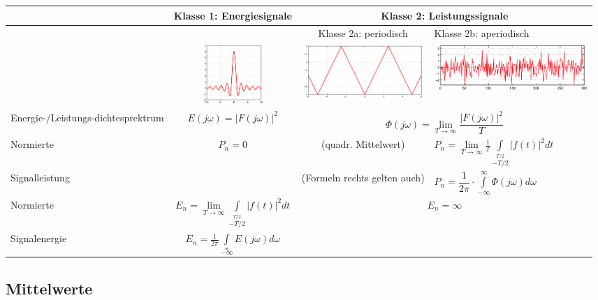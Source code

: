 			\begin{tabularx}{\textwidth}{|p{3.1cm}|c|c|X|}
			\hline
				{}
			&	Klasse 1: Energiesignale
			&	\multicolumn{2}{c|}{Klasse 2: Leistungssignale}
			\\ \hline
				{}
			&	
			&	Klasse 2a: periodisch
			&	Klasse 2b: aperiodisch
			\\ \hline 
				{}
			&	\includegraphics[width=2.3cm]{./bilder/sinc.png}
			& 	\includegraphics[width=4.5cm]{./bilder/dreieck.png}
			& 	\includegraphics[width=5.8cm]{./bilder/rauschen.png}
			\\ \hline 
				Energie-/Leistungs-dichtesprektrum
			& 	$ E(j \omega) = |F(j \omega)|^2 $
			& 	\multicolumn{2}{c|}{$ \Phi(j\omega) = \lim\limits_{T \to \infty} \dfrac{|F(j\omega)|^2}{T} $}
			\\ \hline 
				Normierte
			& 	$ P_n = 0$
			& 	\formel{$P_n = X^2$} (quadr. Mittelwert)
			& 	$ P_n = \lim\limits_{T \rightarrow \infty} \frac{1}{T} 
									\int\limits_{-T/2}\limits^{T/2} |f(t)|^2 dt $
			\\
				Signalleistung
			&
			& 	(Formeln rechts gelten auch)
			& 	$ P_n = \dfrac{1}{2\pi} \cdot \int\limits_{-\infty}^{\infty} \Phi(j\omega) d\omega $
			\\ \hline
				Normierte
			& 	$ E_n = \lim\limits_{T \rightarrow \infty} \int\limits_{-T/2}\limits^{T/2} |f(t)|^2 dt $
			&	\multicolumn{2}{c|}{$ E_n = \infty $}
			\\
				Signalenergie
			& 	$ E_n = \frac{1}{2 \pi} \int\limits_{-\infty}\limits^{\infty}
									E(j \omega) d\omega $
			&	\multicolumn{2}{c|}{}
			\\ \hline
			\end{tabularx}
		
		
	\subsection{Mittelwerte }
		
